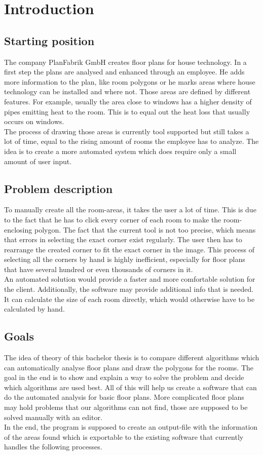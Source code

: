 \section{Introduction}
\subsection{Starting position}
The company PlanFabrik GmbH creates floor plans for house technology. In a first
step the plans are analysed and enhanced through an employee. He adds more
information to the plan, like room polygons or he marks areas where house technology
can be installed and where not. Those areas are defined by different features. For example, usually the area close to windows has a higher density of pipes emitting heat to the room. This is to equal out the heat loss that usually occurs on windows.
\\
The process of drawing those areas is currently tool supported but still takes a lot of time, equal to the rising amount of rooms the employee has to analyze. The idea is to create a more automated system which does require only a small amount of user input.

\subsection{Problem description}
To manually create all the room-areas, it takes the user a lot of time. This is due to the fact that he has to click every corner of each room to make the room-enclosing polygon. The fact that the current tool is not too precise, which means that errors in selecting the exact corner exist regularly. The user then has to rearrange the created corner to fit the exact corner in the image. This process of selecting all the corners by hand is highly inefficient, especially for floor plans that have several hundred or even thousands of corners in it.
\\
An automated solution would provide a faster and more comfortable solution for the client. Additionally, the software may provide additional info that is needed. It can calculate the size of each room directly, which would otherwise have to be calculated by hand.

\subsection{Goals}
The idea of theory of this bachelor thesis is to compare different algorithms which can automatically analyse floor plans and draw the polygons for the rooms. The goal in the end is to show and explain a way to solve the problem and decide which algorithms are used best. All of this will help us create a software that can do the automated analysis for basic floor plans. More complicated floor plans may hold problems that our algorithms can not find, those are supposed to be solved manually with an editor.
\\
In the end, the program is supposed to create an output-file with the information of the areas found which is exportable to the existing software that currently handles the following processes.


